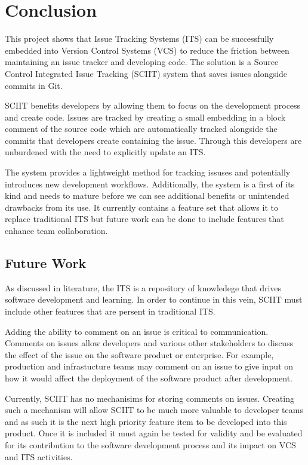 \documentclass{mproj}
\begin{document}
\chapter{Conclusion}\label{conclusion}

This project shows that Issue Tracking Systems (ITS) can be successfully embedded into Version Control Systems (VCS) to reduce the friction between maintaining an issue tracker and developing code. The solution is a Source Control Integrated Issue Tracking (SCIIT) system that saves issues alongside commits in Git.

SCIIT benefits developers by allowing them to focus on the development process and create code. Issues are tracked by creating a small embedding in a block comment of the source code which are automatically tracked alongside the commits that developers create containing the issue. Through this developers are unburdened with the need to explicitly update an ITS.

The system provides a lightweight method for tracking issuses and potentially introduces new development workflows. Additionally, the system is a first of its kind and needs to mature before we can see additional benefits or unintended drawbacks from its use. It currently contains a feature set that allows it to replace traditional ITS but future work can be done to include features that enhance team collaboration.

\section{Future Work}

As discussed in literature, the ITS is a repository of knowledege that drives software development and learning. In order to continue in this vein, SCIIT must include other features that are persent in traditional ITS.

Adding the ability to comment on an issue is critical to communication. Comments on issues allow developers and various other stakeholders to discuss the effect of the issue on the software product or enterprise. For example, production and infrastucture teams may comment on an issue to give input on how it would affect the deployment of the software product after development.

Currently, SCIIT has no mechanisims for storing comments on issues. Creating such a mechanism will allow SCIIT to be much more valuable to developer teams and as such it is the next high priority feature item to be developed into this product. Once it is included it must again be tested for validity and be evaluated for its contribution to the software development process and its impact on VCS and ITS activities.
\end{document}
